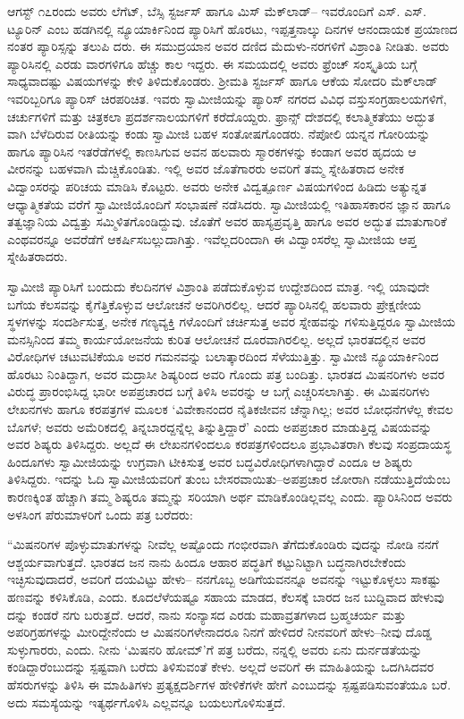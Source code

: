 ಆಗಸ್ಟ್ ೧೭ರಂದು ಅವರು ಲೆಗೆಟ್, ಬೆಸ್ಸಿ ಸ್ಟರ್ಜಸ್ ಹಾಗೂ ಮಿಸ್ ಮೆಕ್​ಲಾಡ್​– ಇವರೊಂದಿಗೆ ಎಸ್. ಎಸ್. ಟ್ಯೂರಿನ್ ಎಂಬ ಹಡಗಿನಲ್ಲಿ ನ್ಯೂಯಾರ್ಕಿನಿಂದ ಪ್ಯಾರಿಸಿಗೆ ಹೊರಟು, ಇಪ್ಪತ್ತನಾಲ್ಕು ದಿನಗಳ ಆನಂದಾಯಕ ಪ್ರಯಾಣದ ನಂತರ ಪ್ಯಾರಿಸ್ಸನ್ನು ತಲುಪಿ ದರು. ಈ ಸಮುದ್ರಯಾನ ಅವರ ದಣಿದ ಮೆದುಳು-ನರಗಳಿಗೆ ವಿಶ್ರಾಂತಿ ನೀಡಿತು. ಅವರು ಪ್ಯಾರಿಸಿನಲ್ಲಿ ಎರಡು ವಾರಗಳಿಗೂ ಹೆಚ್ಚು ಕಾಲ ಇದ್ದರು. ಈ ಸಮಯದಲ್ಲಿ ಅವರು ಫ್ರೆಂಚ್ ಸಂಸ್ಕೃತಿಯ ಬಗ್ಗೆ ಸಾಧ್ಯವಾದಷ್ಟು ವಿಷಯಗಳನ್ನು ಕೇಳಿ ತಿಳಿದುಕೊಂಡರು. ಶ್ರೀಮತಿ ಸ್ಟರ್ಜಸ್ ಹಾಗೂ ಆಕೆಯ ಸೋದರಿ ಮೆಕ್​ಲಾಡ್ ಇವರಿಬ್ಬರಿಗೂ ಪ್ಯಾರಿಸ್ ಚಿರಪರಿಚಿತ. ಇವರು ಸ್ವಾಮೀಜಿಯನ್ನು ಪ್ಯಾರಿಸ್ ನಗರದ ವಿವಿಧ ವಸ್ತುಸಂಗ್ರಹಾಲಯಗಳಿಗೆ, ಚರ್ಚುಗಳಿಗೆ ಮತ್ತು ಚಿತ್ರಕಲಾ ಪ್ರದರ್ಶನಾಲಯಗಳಿಗೆ ಕರೆದೊಯ್ದರು. ಫ್ರಾನ್ಸ್ ದೇಶದಲ್ಲಿ ಕಲಾತ್ಮಿಕತೆಯು ಅದ್ಭುತ ವಾಗಿ ಬೆಳೆದಿರುವ ರೀತಿಯನ್ನು ಕಂಡು ಸ್ವಾಮೀಜಿ ಬಹಳ ಸಂತೋಷಗೊಂಡರು. ನೆಪೋಲಿ ಯನ್ನನ ಗೋರಿಯನ್ನು ಹಾಗೂ ಪ್ಯಾರಿಸಿನ ಇತರೆಡೆಗಳಲ್ಲಿ ಕಾಣಸಿಗುವ ಅವನ ಹಲವಾರು ಸ್ಮಾರಕಗಳನ್ನು ಕಂಡಾಗ ಅವರ ಹೃದಯ ಆ ವೀರನನ್ನು ಬಹಳವಾಗಿ ಮೆಚ್ಚಿಕೊಂಡಿತು. ಇಲ್ಲಿ ಅವರ ಜೊತೆಗಾರರು ಅವರಿಗೆ ತಮ್ಮ ಸ್ನೇಹಿತರಾದ ಅನೇಕ ವಿದ್ವಾಂಸರನ್ನು ಪರಿಚಯ ಮಾಡಿಸಿ ಕೊಟ್ಟರು. ಅವರು ಅನೇಕ ವಿದ್ವತ್ಪೂರ್ಣ ವಿಷಯಗಳಿಂದ ಹಿಡಿದು ಅತ್ಯುನ್ನತ ಆಧ್ಯಾತ್ಮಿಕತೆಯ ವರೆಗೆ ಸ್ವಾಮೀಜಿಯೊಂದಿಗೆ ಸಂಭಾಷಣೆ ನಡೆಸಿದರು. ಸ್ವಾಮೀಜಿಯಲ್ಲಿ ಇತಿಹಾಸಕಾರನ ಜ್ಞಾನ ಹಾಗೂ ತತ್ವಜ್ಞಾನಿಯ ವಿದ್ವತ್ತು ಸಮ್ಮಿಳಿತಗೊಂಡಿದ್ದುವು. ಜೊತೆಗೆ ಅವರ ಹಾಸ್ಯಪ್ರವೃತ್ತಿ ಹಾಗೂ ಅವರ ಅದ್ಭುತ ಮಾತುಗಾರಿಕೆ ಎಂಥವರನ್ನೂ ಅವರೆಡೆಗೆ ಆಕರ್ಷಿಸಬಲ್ಲುದಾಗಿತ್ತು. ಇವೆಲ್ಲದರಿಂದಾಗಿ ಈ ವಿದ್ವಾಂಸರೆಲ್ಲ ಸ್ವಾಮೀಜಿಯ ಆಪ್ತ ಸ್ನೇಹಿತರಾದರು.

ಸ್ವಾಮೀಜಿ ಪ್ಯಾರಿಸಿಗೆ ಬಂದುದು ಕೆಲದಿನಗಳ ವಿಶ್ರಾಂತಿ ಪಡೆದುಕೊಳ್ಳುವ ಉದ್ದೇಶದಿಂದ ಮಾತ್ರ. ಇಲ್ಲಿ ಯಾವುದೇ ಬಗೆಯ ಕೆಲಸವನ್ನು ಕೈಗೆತ್ತಿಕೊಳ್ಳುವ ಆಲೋಚನೆ ಅವರಿಗಿರಲಿಲ್ಲ. ಆದರೆ ಪ್ಯಾರಿಸಿನಲ್ಲಿ ಹಲವಾರು ಪ್ರೇಕ್ಷಣೀಯ ಸ್ಥಳಗಳನ್ನು ಸಂದರ್ಶಿಸುತ್ತ, ಅನೇಕ ಗಣ್ಯವ್ಯಕ್ತಿ ಗಳೊಂದಿಗೆ ಚರ್ಚಿಸುತ್ತ ಅವರ ಸ್ನೇಹವನ್ನು ಗಳಿಸುತ್ತಿದ್ದರೂ ಸ್ವಾಮೀಜಿಯ ಮನಸ್ಸಿನಿಂದ ತಮ್ಮ ಕಾರ್ಯಯೋಜನೆಯ ಕುರಿತ ಆಲೋಚನೆ ದೂರವಾಗಿರಲಿಲ್ಲ. ಅಲ್ಲದೆ ಭಾರತದಲ್ಲಿನ ಅವರ ವಿರೋಧಿಗಳ ಚಟುವಟಿಕೆಯೂ ಅವರ ಗಮನವನ್ನು ಬಲಾತ್ಕಾರದಿಂದ ಸೆಳೆಯುತ್ತಿತ್ತು. ಸ್ವಾಮೀಜಿ ನ್ಯೂಯಾರ್ಕಿನಿಂದ ಹೊರಟು ನಿಂತಿದ್ದಾಗ, ಅವರ ಮದ್ರಾಸೀ ಶಿಷ್ಯರಿಂದ ಅವರಿ ಗೊಂದು ಪತ್ರ ಬಂದಿತ್ತು. ಭಾರತದ ಮಿಷನರಿಗಳು ಅವರ ವಿರುದ್ಧ ಪ್ರಾರಂಭಿಸಿದ್ದ ಭಾರೀ ಅಪಪ್ರಚಾರದ ಬಗ್ಗೆ ತಿಳಿಸಿ ಅವರನ್ನು ಆ ಬಗ್ಗೆ ಎಚ್ಚರಿಸಲಾಗಿತ್ತು. ಈ ಮಿಷನರಿಗಳು ಲೇಖನಗಳು ಹಾಗೂ ಕರಪತ್ರಗಳ ಮೂಲಕ ‘ವಿವೇಕಾನಂದರ ನೈತಿಕಜೀವನ ಚೆನ್ನಾಗಿಲ್ಲ; ಅವರ ಬೋಧನೆಗಳೆಲ್ಲ ಕೇವಲ ಬೊಗಳೆ; ಅವರು ಅಮೆರಿಕದಲ್ಲಿ ತಿನ್ನಬಾರದ್ದನ್ನೆಲ್ಲ ತಿನ್ನುತ್ತಿದ್ದಾರೆ’ ಎಂದು ಅಪಪ್ರಚಾರ ಮಾಡುತ್ತಿದ್ದ ವಿಷಯವನ್ನು ಅವರ ಶಿಷ್ಯರು ತಿಳಿಸಿದ್ದರು. ಅಲ್ಲದೆ ಈ ಲೇಖನಗಳಿಂದಲೂ ಕರಪತ್ರಗಳಿಂದಲೂ ಪ್ರಭಾವಿತರಾಗಿ ಕೆಲವು ಸಂಪ್ರದಾಯಸ್ಥ ಹಿಂದೂಗಳು ಸ್ವಾಮೀಜಿಯನ್ನು ಉಗ್ರವಾಗಿ ಟೀಕಿಸುತ್ತ ಅವರ ಬದ್ಧವಿರೋಧಿಗಳಾಗಿದ್ದಾರೆ ಎಂದೂ ಆ ಶಿಷ್ಯರು ತಿಳಿಸಿದ್ದರು. ಇದನ್ನು ಓದಿ ಸ್ವಾಮೀಜಿಯವರಿಗೆ ತುಂಬ ಬೇಸರವಾಯಿತು–ಅಪಪ್ರಚಾರ ಜೋರಾಗಿ ನಡೆಯುತ್ತಿದೆಯೆಂಬ ಕಾರಣಕ್ಕಿಂತ ಹೆಚ್ಚಾಗಿ ತಮ್ಮ ಶಿಷ್ಯರೂ ತಮ್ಮನ್ನು ಸರಿಯಾಗಿ ಅರ್ಥ ಮಾಡಿಕೊಂಡಿಲ್ಲವಲ್ಲ ಎಂದು. ಪ್ಯಾರಿಸಿನಿಂದ ಅವರು ಅಳಸಿಂಗ ಪೆರುಮಾಳರಿಗೆ ಒಂದು ಪತ್ರ ಬರೆದರು:

“ಮಿಷನರಿಗಳ ಪೊಳ್ಳುಮಾತುಗಳನ್ನು ನೀವೆಲ್ಲ ಅಷ್ಟೊಂದು ಗಂಭೀರವಾಗಿ ತೆಗೆದುಕೊಂಡಿರು ವುದನ್ನು ನೋಡಿ ನನಗೆ ಆಶ್ಚರ್ಯವಾಗುತ್ತದೆ. ಭಾರತದ ಜನ ನಾನು ಹಿಂದೂ ಆಹಾರ ಪದ್ಧತಿಗೆ ಕಟ್ಟುನಿಟ್ಟಾಗಿ ಬದ್ಧನಾಗಿರಬೇಕೆಂದು ಇಚ್ಛಿಸುವುದಾದರೆ, ಅವರಿಗೆ ದಯವಿಟ್ಟು ಹೇಳು– ನನಗೊಬ್ಬ ಅಡಿಗೆಯವನನ್ನೂ ಅವನನ್ನು ಇಟ್ಟುಕೊಳ್ಳಲು ಸಾಕಷ್ಟು ಹಣವನ್ನು ಕಳಿಸಿಕೊಡಿ, ಎಂದು. ಕೂದಲೆಳೆಯಷ್ಟೂ ಸಹಾಯ ಮಾಡದ, ಕೆಲಸಕ್ಕೆ ಬಾರದ ಜನ ಬುದ್ದಿವಾದ ಹೇಳುವು ದನ್ನು ಕಂಡರೆ ನಗು ಬರುತ್ತದೆ. ಆದರೆ, ನಾನು ಸಂನ್ಯಾಸದ ಎರಡು ಮಹಾವ್ರತಗಳಾದ ಬ್ರಹ್ಮಚರ್ಯ ಮತ್ತು ಅಪರಿಗ್ರಹಗಳನ್ನು ಮೀರಿದ್ದೇನೆಂದು ಆ ಮಿಷನರಿಗಳೇನಾದರೂ ನಿನಗೆ ಹೇಳಿದರೆ ನೀನವರಿಗೆ ಹೇಳು–ನೀವು ದೊಡ್ಡ ಸುಳ್ಳುಗಾರರು, ಎಂದು. ನೀನು ‘ಮಿಷನರಿ ಹೋಮ್​’ಗೆ ಪತ್ರ ಬರೆದು, ನನ್ನಲ್ಲಿ ಅವರು ಏನು ದುರ್ನಡತೆಯನ್ನು ಕಂಡಿದ್ದಾರೆಂಬುದನ್ನು ಸ್ಪಷ್ಟವಾಗಿ ಬರೆದು ತಿಳಿಸುವಂತೆ ಕೇಳು. ಅಲ್ಲದೆ ಅವರಿಗೆ ಈ ಮಾಹಿತಿಯನ್ನು ಒದಗಿಸಿದವರ ಹೆಸರುಗಳನ್ನು ತಿಳಿಸಿ ಈ ಮಾಹಿತಿಗಳು ಪ್ರತ್ಯಕ್ಷದರ್ಶಿಗಳ ಹೇಳಿಕೆಗಳೇ ಹೇಗೆ ಎಂಬುದನ್ನು ಸ್ಪಷ್ಟಪಡಿಸುವಂತೆಯೂ ಬರೆ. ಅದು ಸಮಸ್ಯೆಯನ್ನು ಇತ್ಯರ್ಥಗೊಳಿಸಿ ಎಲ್ಲವನ್ನೂ ಬಯಲುಗೊಳಿಸುತ್ತದೆ.

